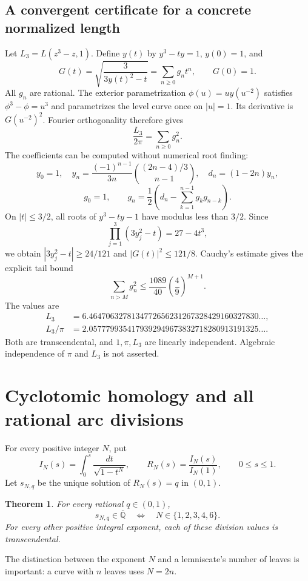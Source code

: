 \documentclass[11pt,a4paper]{article}
\numberwithin{equation}{section}
\newtheorem{theorem}{Theorem}[section]
\theoremstyle{definition}
\theoremstyle{remark}
\newcommand{\Qb}{\overline{\mathbb Q}}
\begin{document}
\subsection{A convergent certificate for a concrete normalized length}
Let $L_3=L(z^3-z,1)$. Define $y(t)$ by
$y^3-ty=1$, $y(0)=1$, and
\[
 G(t)=\sqrt{\frac3{3y(t)^2-t}}=\sum_{n\ge0}g_nt^n,\qquad G(0)=1.
\]
All $g_n$ are rational. The exterior parametrization
$\phi(u)=u y(u^{-2})$ satisfies $\phi^3-\phi=u^3$ and parametrizes the
level curve once on $|u|=1$. Its derivative is $G(u^{-2})^2$.
Fourier orthogonality therefore gives
\begin{equation}\label{eq:L3-series}
 \frac{L_3}{2\pi}=\sum_{n\ge0}g_n^2.
\end{equation}
The coefficients can be computed without numerical root finding:
\[
 y_0=1,\quad
 y_n=\frac{(-1)^{n-1}}{3n}\binom{(2n-4)/3}{n-1},\quad
 d_n=(1-2n)y_n,
\]
\[
 g_0=1,\qquad
 g_n=\frac12\left(d_n-\sum_{k=1}^{n-1}g_kg_{n-k}\right).
\]
On $|t|\le3/2$, all roots of $y^3-ty-1$ have modulus less than $3/2$.
Since
\[
 \prod_{j=1}^3(3y_j^2-t)=27-4t^3,
\]
we obtain $|3y_j^2-t|\ge24/121$ and $|G(t)|^2\le121/8$.
Cauchy's estimate gives the explicit tail bound
\begin{equation}\label{eq:L3-tail}
 \sum_{n>M}g_n^2\le\frac{1089}{40}\left(\frac49\right)^{M+1}.
\end{equation}
The values are
\begin{align*}
 L_3&=6.4647063278134772656231267328429160327830\ldots,\\
 L_3/\pi&=2.0577799354179392949673832718280913191325\ldots.
\end{align*}
Both are transcendental, and $1,\pi,L_3$ are linearly independent.
Algebraic independence of $\pi$ and $L_3$ is not asserted.

\section{Cyclotomic homology and all rational arc divisions}\label{sec:division}
For every positive integer $N$, put
\begin{equation}\label{eq:IN}
 I_N(s)=\int_0^s\frac{dt}{\sqrt{1-t^N}},\qquad
 R_N(s)=\frac{I_N(s)}{I_N(1)},\qquad0\le s\le1.
\end{equation}
Let $s_{N,q}$ be the unique solution of $R_N(s)=q$ in $(0,1)$.

\begin{theorem}\label{thm:all-division}
For every rational $q\in(0,1)$,
\[
 s_{N,q}\in\Qb\quad\Longleftrightarrow\quad N\in\{1,2,3,4,6\}.
\]
For every other positive integral exponent, each of these division values is
transcendental.
\end{theorem}
The distinction between the exponent $N$ and a lemniscate's number of leaves
is important: a curve with $n$ leaves uses $N=2n$.
\end{document}
